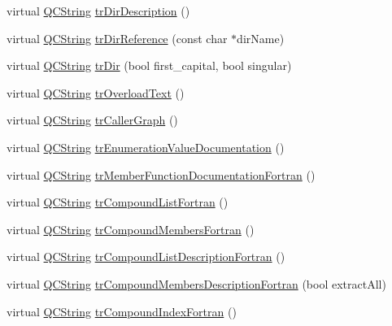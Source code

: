 \begin{DoxyCompactItemize}
virtual \mbox{\hyperlink{class_q_c_string}{Q\+C\+String}} \mbox{\hyperlink{class_translator_croatian_ac96115200792ccb74b3ade5287d2413f}{tr\+Dir\+Description}} ()
\item 
virtual \mbox{\hyperlink{class_q_c_string}{Q\+C\+String}} \mbox{\hyperlink{class_translator_croatian_ace3893f9dddde8d1ccc27e7a286bd6b9}{tr\+Dir\+Reference}} (const char $\ast$dir\+Name)
\item 
virtual \mbox{\hyperlink{class_q_c_string}{Q\+C\+String}} \mbox{\hyperlink{class_translator_croatian_a10a3224ece15bbb3004ae9ec02fc2335}{tr\+Dir}} (bool first\+\_\+capital, bool singular)
\item 
virtual \mbox{\hyperlink{class_q_c_string}{Q\+C\+String}} \mbox{\hyperlink{class_translator_croatian_a129d80bf2481e1195a1dcb2e44299b8d}{tr\+Overload\+Text}} ()
\item 
virtual \mbox{\hyperlink{class_q_c_string}{Q\+C\+String}} \mbox{\hyperlink{class_translator_croatian_ad00aca202061f70b8c307335009491d9}{tr\+Caller\+Graph}} ()
\item 
virtual \mbox{\hyperlink{class_q_c_string}{Q\+C\+String}} \mbox{\hyperlink{class_translator_croatian_a570d826f15efb5bda206077852bb439b}{tr\+Enumeration\+Value\+Documentation}} ()
\item 
virtual \mbox{\hyperlink{class_q_c_string}{Q\+C\+String}} \mbox{\hyperlink{class_translator_croatian_a35efefe1960664105587cb5521828c15}{tr\+Member\+Function\+Documentation\+Fortran}} ()
\item 
virtual \mbox{\hyperlink{class_q_c_string}{Q\+C\+String}} \mbox{\hyperlink{class_translator_croatian_aabd4494644ea85368800b6c746cb5c40}{tr\+Compound\+List\+Fortran}} ()
\item 
virtual \mbox{\hyperlink{class_q_c_string}{Q\+C\+String}} \mbox{\hyperlink{class_translator_croatian_ac363f07c47837a9ca20179b9fd164c35}{tr\+Compound\+Members\+Fortran}} ()
\item 
virtual \mbox{\hyperlink{class_q_c_string}{Q\+C\+String}} \mbox{\hyperlink{class_translator_croatian_a4e11f2481581e629cf456830eb73e5fe}{tr\+Compound\+List\+Description\+Fortran}} ()
\item 
virtual \mbox{\hyperlink{class_q_c_string}{Q\+C\+String}} \mbox{\hyperlink{class_translator_croatian_a49a09bde699d280d7c20502bfc906ca9}{tr\+Compound\+Members\+Description\+Fortran}} (bool extract\+All)
\item 
virtual \mbox{\hyperlink{class_q_c_string}{Q\+C\+String}} \mbox{\hyperlink{class_translator_croatian_a72bacf57e2216baa5c7952f805b68003}{tr\+Compound\+Index\+Fortran}} ()

\end{DoxyCompactItemize}
